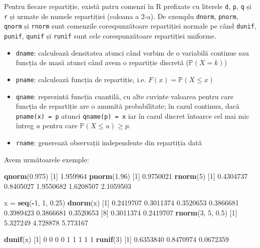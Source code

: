 \documentclass[]{article}
\newenvironment{Shaded}{\begin{snugshade}}{\end{snugshade}}
\newcommand{\KeywordTok}[1]{\textcolor[rgb]{0.13,0.29,0.53}{\textbf{#1}}}
\newcommand{\DecValTok}[1]{\textcolor[rgb]{0.00,0.00,0.81}{#1}}
\newcommand{\FloatTok}[1]{\textcolor[rgb]{0.00,0.00,0.81}{#1}}
\newcommand{\StringTok}[1]{\textcolor[rgb]{0.31,0.60,0.02}{#1}}
\newcommand{\OperatorTok}[1]{\textcolor[rgb]{0.81,0.36,0.00}{\textbf{#1}}}
\newcommand{\NormalTok}[1]{#1}
\begin{document}
Pentru fiecare repartiție, există patru comenzi în R prefixate cu
literele \texttt{d}, \texttt{p}, \texttt{q} și \texttt{r} și urmate de
numele repartiției (coloana a 2-a). De exemplu \texttt{dnorm},
\texttt{pnorm}, \texttt{qnorm} și \texttt{rnorm} sunt comenzile
corespunzătoare repartiției normale pe când \texttt{dunif},
\texttt{punif}, \texttt{qunif} și \texttt{runif} sunt cele
corespunzătoare repartiției uniforme.

\begin{itemize}
\item
  \texttt{dname}: calculează densitatea atunci când vorbim de o
  variabilă continue sau funcția de masă atunci când avem o repartiție
  discretă (\(\mathbb{P}(X=k)\))
\item
  \texttt{pname}: calculează funcția de repartiție, i.e.
  \(F(x)=\mathbb{P}(X\leq x)\)
\item
  \texttt{qname}: reprezintă funcția cuantilă, cu alte cuvinte valoarea
  pentru care funcția de repartiție are o anumită probabilitate; în
  cazul continuu, dacă \texttt{pname(x)\ =\ p} atunci
  \texttt{qname(p)\ =\ x} iar în cazul discret întoarce cel mai mic
  întreg \(u\) pentru care \(\mathbb{P}(X\leq u)\geq p\).
\item
  \texttt{rname}: generează observații independente din repartiția dată
\end{itemize}

Avem următoarele exemple:

\begin{Shaded}
\begin{Highlighting}[]
\KeywordTok{qnorm}\NormalTok{(}\FloatTok{0.975}\NormalTok{)}
\NormalTok{[}\DecValTok{1}\NormalTok{] }\FloatTok{1.959964}
\KeywordTok{pnorm}\NormalTok{(}\FloatTok{1.96}\NormalTok{)}
\NormalTok{[}\DecValTok{1}\NormalTok{] }\FloatTok{0.9750021}
\KeywordTok{rnorm}\NormalTok{(}\DecValTok{5}\NormalTok{)}
\NormalTok{[}\DecValTok{1}\NormalTok{] }\FloatTok{0.4304737} \FloatTok{0.8405027} \FloatTok{1.9550682} \FloatTok{1.6208507} \FloatTok{2.1059503}

\NormalTok{x =}\StringTok{ }\KeywordTok{seq}\NormalTok{(}\OperatorTok{-}\DecValTok{1}\NormalTok{, }\DecValTok{1}\NormalTok{, }\FloatTok{0.25}\NormalTok{)}
\KeywordTok{dnorm}\NormalTok{(x)}
\NormalTok{[}\DecValTok{1}\NormalTok{] }\FloatTok{0.2419707} \FloatTok{0.3011374} \FloatTok{0.3520653} \FloatTok{0.3866681} \FloatTok{0.3989423} \FloatTok{0.3866681} \FloatTok{0.3520653}
\NormalTok{[}\DecValTok{8}\NormalTok{] }\FloatTok{0.3011374} \FloatTok{0.2419707}
\KeywordTok{rnorm}\NormalTok{(}\DecValTok{3}\NormalTok{, }\DecValTok{5}\NormalTok{, }\FloatTok{0.5}\NormalTok{)}
\NormalTok{[}\DecValTok{1}\NormalTok{] }\FloatTok{5.327249} \FloatTok{4.728878} \FloatTok{5.773167}

\KeywordTok{dunif}\NormalTok{(x)}
\NormalTok{[}\DecValTok{1}\NormalTok{] }\DecValTok{0} \DecValTok{0} \DecValTok{0} \DecValTok{0} \DecValTok{1} \DecValTok{1} \DecValTok{1} \DecValTok{1} \DecValTok{1}
\KeywordTok{runif}\NormalTok{(}\DecValTok{3}\NormalTok{)}
\NormalTok{[}\DecValTok{1}\NormalTok{] }\FloatTok{0.6353840} \FloatTok{0.8470974} \FloatTok{0.0672359}
\end{Highlighting}
\end{Shaded}
\end{document}
